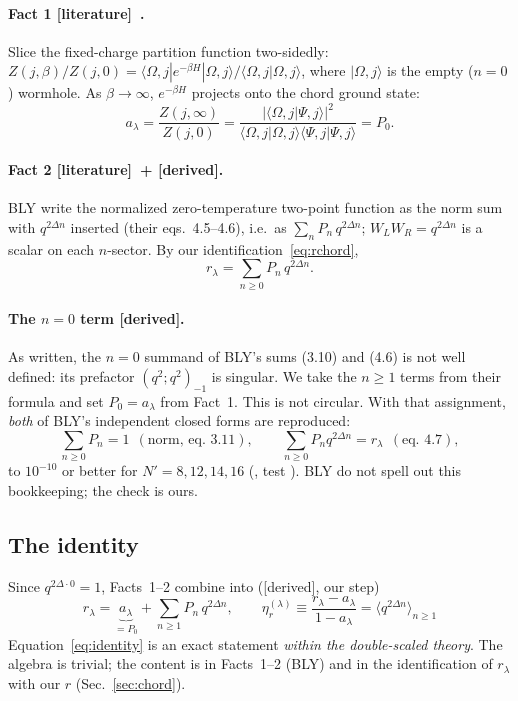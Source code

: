 \documentclass[11pt]{article}
\newcommand{\ket}[1]{\lvert #1\rangle}
\newcommand{\Np}{N'}
\newcommand{\tagbox}[2]{\textsf{\small\color{#1}[#2]}}
\newcommand{\EST}{\tagbox{cest}{literature}}
\newcommand{\DER}{\tagbox{cder}{derived}}
\theoremstyle{remark}
\begin{document}
\paragraph{Fact 1 \EST\ \cite[eqs.~1.1, 3.12--3.15]{BLY}.}
Slice the fixed-charge partition function two-sidedly:
$Z(j,\beta)/Z(j,0)=\langle\Omega,j|e^{-\beta H}|\Omega,j\rangle/\langle\Omega,j|\Omega,j\rangle$, where $\ket{\Omega,j}$
is the empty ($n=0$) wormhole. As $\beta\to\infty$, $e^{-\beta H}$ projects onto the chord ground state:
\begin{equation}
a_\lambda=\frac{Z(j,\infty)}{Z(j,0)}=\frac{|\langle\Omega,j|\Psi,j\rangle|^2}{\langle\Omega,j|\Omega,j\rangle\langle\Psi,j|\Psi,j\rangle}=P_0 .
\label{eq:aP0}
\end{equation}

\paragraph{Fact 2 \EST\ + \DER.} BLY write the normalized zero-temperature two-point function as the norm sum with
$q^{2\Delta n}$ inserted (their eqs.~4.5--4.6), i.e.\ as $\sum_nP_n\,q^{2\Delta n}$; $W_LW_R=q^{2\Delta n}$ is a scalar on
each $n$-sector. By our identification~\eqref{eq:rchord},
\begin{equation}
r_\lambda=\sum_{n\ge0}P_n\,q^{2\Delta n}.
\label{eq:rPn}
\end{equation}

\paragraph{The $n=0$ term \DER.} As written, the $n=0$ summand of BLY's sums (3.10) and (4.6) is not well defined:
its prefactor $(q^2;q^2)_{-1}$ is singular. We take the $n\ge1$ terms from their formula and set $P_0=a_\lambda$ from
Fact~1. This is not circular. With that assignment, \emph{both} of BLY's independent closed forms are reproduced:
\[
\textstyle\sum_{n\ge0}P_n=1\ \ (\text{norm, eq.~3.11}),\qquad \sum_{n\ge0}P_nq^{2\Delta n}=r_\lambda\ \ (\text{eq.~4.7}),
\]
to $10^{-10}$ or better for $\Np=8,12,14,16$ (, test
). BLY do not spell out this bookkeeping; the check is ours.

\subsection{The identity}
Since $q^{2\Delta\cdot0}=1$, Facts~1--2 combine into (\DER, our step)
\begin{equation}
\boxed{\;r_\lambda=\underbrace{a_\lambda}_{=P_0}+\sum_{n\ge1}P_n\,q^{2\Delta n},\qquad
\eta_r^{(\lambda)}\equiv\frac{r_\lambda-a_\lambda}{1-a_\lambda}=\big\langle q^{2\Delta n}\big\rangle_{n\ge1}\;}
\label{eq:identity}
\end{equation}
Equation~\eqref{eq:identity} is an exact statement \emph{within the double-scaled theory}. The algebra is trivial;
the content is in Facts~1--2 (BLY) and in the identification of $r_\lambda$ with our $r$ (Sec.~\ref{sec:chord}).
\end{document}
